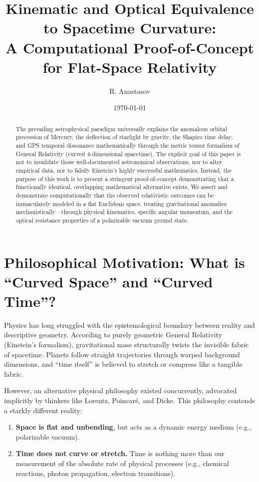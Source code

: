 \documentclass[reprint,amsmath,amssymb,aps,prd,twocolumn]{revtex4-2}
\begin{document}
\title{Kinematic and Optical Equivalence to Spacetime Curvature:\\A Computational Proof-of-Concept for Flat-Space Relativity}

\author{R. Anastasov}
\date{\today}

\begin{abstract}
The prevailing astrophysical paradigm universally explains the anomalous orbital precession of Mercury, the deflection of starlight by gravity, the Shapiro time delay, and GPS temporal dissonance mathematically through the metric tensor formalism of General Relativity (curved 4-dimensional spacetime). The explicit goal of this paper is not to invalidate those well-documented astronomical observations, nor to alter empirical data, nor to falsify Einstein's highly successful mathematics. Instead, the purpose of this work is to present a stringent proof-of-concept demonstrating that a functionally identical, overlapping mathematical alternative exists. We assert and demonstrate computationally that the observed relativistic outcomes can be immaculately modeled in a flat Euclidean space, treating gravitational anomalies mechanistically---through physical kinematics, specific angular momentum, and the optical resistance properties of a polarizable vacuum ground state.
\end{abstract}

\maketitle

\section{Philosophical Motivation: What is ``Curved Space'' and ``Curved Time''?}

Physics has long struggled with the epistemological boundary between reality and descriptive geometry. According to purely geometric General Relativity (Einstein’s formalism), gravitational mass structurally twists the invisible fabric of spacetime. Planets follow straight trajectories through warped background dimensions, and ``time itself'' is believed to stretch or compress like a tangible fabric.

However, an alternative physical philosophy existed concurrently, advocated implicitly by thinkers like Lorentz, Poincaré, and Dicke. This philosophy contends a starkly different reality:
\begin{enumerate}
    \item \textbf{Space is flat and unbending}, but acts as a dynamic energy medium (e.g., polarizable vacuum).
    \item \textbf{Time does not curve or stretch.} Time is nothing more than our measurement of the absolute rate of physical processes (e.g., chemical reactions, photon propagation, electron transitions).
\end{enumerate}
\end{document}
